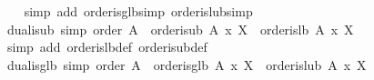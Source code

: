 \begin{isabellebody}
%
\isadelimproof
\ \ %
\endisadelimproof
%
\isatagproof
{}\isamarkupfalse%
\ {}simp\ add{}\ order{}is{}glb{}simp\ order{}is{}lub{}simp{}%
\endisatagproof
{\isafoldproof}%
%
\isadelimproof
\isanewline
%
\endisadelimproof
\isanewline
{}\isamarkupfalse%
\ dual{}is{}ub\ {}simp{}{}\ {}order\ A\ {}\ order{}is{}ub\ {}A{}{}\ x\ X\ {}\ order{}is{}lb\ A\ x\ X{}\isanewline
%
\isadelimproof
\ \ %
\endisadelimproof
%
\isatagproof
{}\isamarkupfalse%
\ {}simp\ add{}\ order{}is{}lb{}def\ order{}is{}ub{}def{}%
\endisatagproof
{\isafoldproof}%
%
\isadelimproof
\isanewline
%
\endisadelimproof
\isanewline
{}\isamarkupfalse%
\ dual{}is{}glb\ {}simp{}{}\ {}order\ A\ {}\ order{}is{}glb\ {}A{}{}\ x\ X\ {}\ order{}is{}lub\ A\ x\ X{}\isanewline
%
\isadelimproof
\ \ %
\endisadelimproof
%
\isatagproof

\end{isabellebody}
